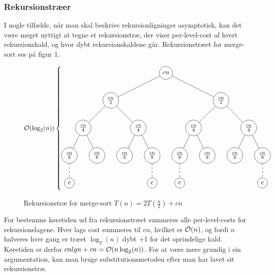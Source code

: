 \subsubsection{Rekursionstræer}
I nogle tilfælde, når man skal beskrive rekursionligninger asymptotisk, kan det være meget nyttigt at tegne et rekursionstræ, der viser per-level-cost af hvert rekursionskald, og hvor dybt rekursionskaldene går. Rekursionstræet for merge-sort ses på figur 1.

\begin{figure}[h!]
  \caption{Rekursionstræ for merge-sort $T(n) = 2T(\frac{n}{2}) + cn$}
  \begin{equation*}
    \O(\log_2(n))\left \{
      \begin{gathered}
        \begin{tikzpicture}[every node/.style = {shape=circle, draw, align=center}, level distance=1.5cm,
          level 1/.style={sibling distance=6cm},
          level 2/.style={sibling distance=3cm},
          level 3/.style={sibling distance=1.5cm},
          emph/.style={edge from parent/.style={dashed,draw}}]
          \node(A) at (0, 0) {$cn$}
          child { node {$\frac{cn}{2}$}
            child { node {$\frac{cn}{4}$}
              child { node {$\frac{cn}{8}$}
                child[emph] { node {c} }}
              child { node {$\frac{cn}{8}$} }}
            child { node {$\frac{cn}{4}$}
              child { node {$\frac{cn}{8}$} }
              child { node {$\frac{cn}{8}$}
                child[emph] { node {c} }}}}
          child { node {$\frac{cn}{2}$}
            child { node {$\frac{cn}{4}$}
              child { node {$\frac{cn}{8}$}
                child[emph] { node {c} }}
              child { node {$\frac{cn}{8}$} }}
            child { node {$\frac{cn}{4}$}
              child { node {$\frac{cn}{8}$} }
              child { node {$\frac{cn}{8}$}
                child[emph] { node {c} }}}};
        \end{tikzpicture}
      \end{gathered}
    \right.
  \end{equation*}
\end{figure}

For bestemme køretiden ud fra rekursionstræet summeres alle per-level-costs for rekursionslagene. Hver lags cost summeres til $cn$, hvilket er $\mathcal{O}(n)$, og fordi $n$ halveres hver gang er træet $\log_2(n)$ dybt +1 for det oprindelige kald. Køretiden er derfor $cnlgn + cn = \mathcal{O}(n\log_2(n))$. For at være mere grundig i sin argumentation, kan man bruge substitutionsmetoden efter man har lavet sit rekursionstræ.
